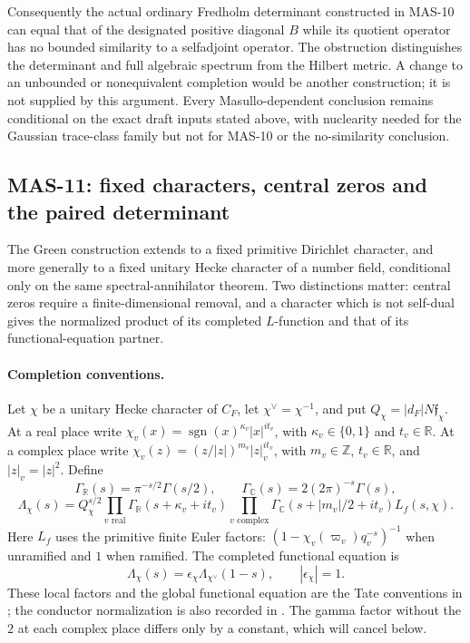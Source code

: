 \documentclass[11pt,a4paper]{article}
\newcommand{\R}{\mathbb R}
\newcommand{\C}{\mathbb C}
\newcommand{\Z}{\mathbb Z}
\newcommand{\fid}[1]{\textsf{#1}}
\begin{document}
Consequently the actual ordinary Fredholm determinant constructed in \fid{MAS-10} can equal that of the designated positive diagonal $B$ while its quotient operator has no bounded similarity to a selfadjoint operator. The obstruction distinguishes the determinant and full algebraic spectrum from the Hilbert metric. A change to an unbounded or nonequivalent completion would be another construction; it is not supplied by this argument. Every Masullo-dependent conclusion remains conditional on the exact draft inputs stated above, with nuclearity needed for the Gaussian trace-class family but not for \fid{MAS-10} or the no-similarity conclusion.

\subsection{MAS-11: fixed characters, central zeros and the paired determinant}
The Green construction extends to a fixed primitive Dirichlet character, and more generally to a fixed unitary Hecke character of a number field, conditional only on the same spectral-annihilator theorem. Two distinctions matter: central zeros require a finite-dimensional removal, and a character which is not self-dual gives the normalized product of its completed $L$-function and that of its functional-equation partner.

\paragraph{Completion conventions.}
Let $\chi$ be a unitary Hecke character of $C_F$, let $\chi^\vee=\chi^{-1}$, and put $Q_\chi=|d_F|N\mathfrak f_\chi$. At a real place write $\chi_v(x)=\operatorname{sgn}(x)^{\kappa_v}|x|^{it_v}$, with $\kappa_v\in\{0,1\}$ and $t_v\in\R$. At a complex place write $\chi_v(z)=(z/|z|)^{m_v}|z|_v^{it_v}$, with $m_v\in\Z$, $t_v\in\R$, and $|z|_v=|z|^2$. Define
\[
 \Gamma_{\R}(s)=\pi^{-s/2}\Gamma(s/2),\qquad
 \Gamma_{\C}(s)=2(2\pi)^{-s}\Gamma(s),
\]
\[
 \Lambda_\chi(s)=Q_\chi^{s/2}
 \prod_{v\text{ real}}\Gamma_{\R}(s+\kappa_v+it_v)
 \prod_{v\text{ complex}}\Gamma_{\C}(s+|m_v|/2+it_v)
 L_f(s,\chi).
\]
Here $L_f$ uses the primitive finite Euler factors: $(1-\chi_v(\varpi_v)q_v^{-s})^{-1}$ when unramified and $1$ when ramified. The completed functional equation is
\[
 \Lambda_\chi(s)=\epsilon_\chi\Lambda_{\chi^\vee}(1-s),
 \qquad |\epsilon_\chi|=1.
\]
These local factors and the global functional equation are the Tate conventions in \cite[\S4.7, pp.~19--22; Theorem 5.22, pp.~38--39]{poonen786}; the conductor normalization is also recorded in \cite[\S1, pp.~281--282]{rajan1998}. The gamma factor without the $2$ at each complex place differs only by a constant, which will cancel below.
\end{document}
